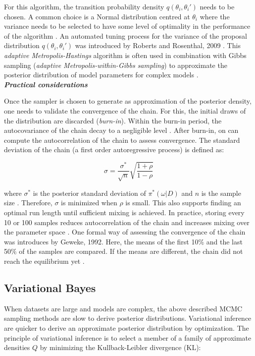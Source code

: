 For this algorithm, the transition probability density $q(\theta_i,\theta_i')$ needs to be chosen. A common choice is a Normal distribution centred at $\theta_i$ where the variance needs to be selected to have some level of optimality in the performance of the algorithm \citep{Roberts2001}. An automated tuning process for the variance of the proposal distribution $q(\theta_i,\theta_i')$ was introduced by Roberts and Rosenthal, 2009 \citep{Roberts2009}. This \emph{adaptive Metropolis-Hastings} algorithm is often used in combination with Gibbs sampling (\emph{adaptive Metropolis-within-Gibbs sampling}) to approximate the posterior distribution of model parameters for complex models \citep{Roberts2009}.\\

\textbf{\textit{Practical considerations}}

Once the sampler is chosen to generate as approximation of the posterior density, one needs to validate the convergence of the chain. For this, the initial draws of the distribution are discarded (\emph{burn-in}). Within the burn-in period, the autocovariance of the chain decay to a negligible level \citep{Greyer1992}. After burn-in, on can compute the autocorrelation of the chain to assess convergence. The standard deviation of the chain (a first order autoregressive process) is defined as:

\begin{equation}
\sigma=\frac{\sigma^*}{\sqrt{n}}\sqrt{\frac{1+\rho}{1-\rho}}
\end{equation}

where $\sigma^*$ is the posterior standard deviation of $\pi^*(\omega|D)$  and $n$ is the sample size \cite{Tierney1991}. Therefore, $\sigma$ is minimized when $\rho$ is small. This also supports finding an optimal run length until sufficient mixing is achieved. In practice, storing every 10 or 100 samples reduces autocorrelation of the chain and increases mixing over the parameter space \citep{Greyer1992}. One formal way of assessing the convergence of the chain was introduces by Geweke, 1992. Here, the means of the first 10\% and the last 50\% of the samples are compared. If the means are different, the chain did not reach the equilibrium yet \citep{Geweke1992}.

\subsection{Variational Bayes}

When datasets are large and models are complex, the above described MCMC sampling methods are slow to derive posterior distributions. Variational inference are quicker to derive an approximate posterior distribution by optimization. The principle of variational inference is to select a member of a family of approximate densities $Q$ by minimizing the Kullback-Leibler divergence (KL):

